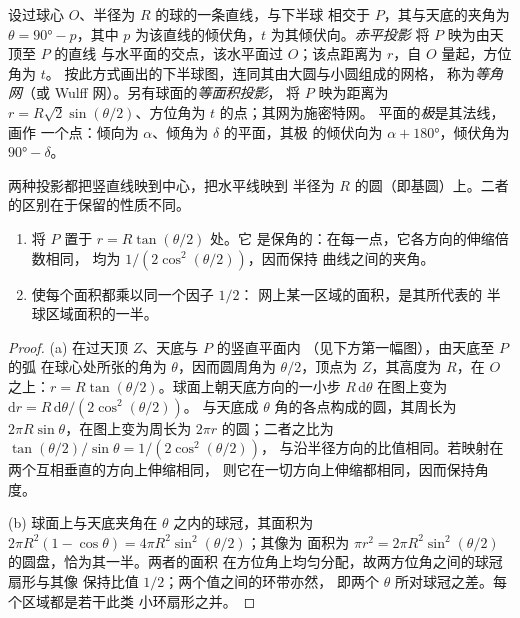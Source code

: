 \begin{definition}\label{def:b3:structural-analysis:stereo}
设过球心 $O$、半径为 $R$ 的球的一条直线，与下半球
相交于 $P$，其与天底的夹角为 $\theta = \ang{90} - p$，其中
$p$ 为该直线的倾伏角，$t$ 为其倾伏向。\emph{赤平投影}
将 $P$ 映为由天顶至 $P$ 的直线
与水平面的交点，该水平面过
$O$；该点距离为 $r$，自 $O$ 量起，方位角为 $t$。
按此方式画出的下半球图，连同其由大圆与小圆组成的网格，
称为\emph{等角网}（或
Wulff 网）。另有球面的\emph{等面积投影}，
将 $P$ 映为距离为 $r =
R\sqrt2\sin(\theta/2)$、方位角为 $t$ 的点；其网为施密特网。
平面的\emph{极}是其法线，画作
一个点：倾向为 $\alpha$、倾角为 $\delta$ 的平面，其极
的倾伏向为 $\alpha + \ang{180}$，倾伏角为 $\ang{90} - \delta$。
\end{definition}

两种投影都把竖直线映到中心，把水平线映到
半径为 $R$ 的圆（即基圆）上。二者的区别在于保留的性质不同。

\begin{theorem}[两种投影]\label{thm:b3:structural-analysis:projections}
\begin{enumerate}[label=(\alph*)]
  \item {}将 $P$ 置于 $r = R\tan(\theta/2)$ 处。它
        是保角的：在每一点，它各方向的伸缩倍数相同，
        均为 $1/(2\cos^2(\theta/2))$，因而保持
        曲线之间的夹角。
  \item {}使每个面积都乘以同一个因子 $1/2$：
        网上某一区域的面积，是其所代表的
        半球区域面积的一半。
\end{enumerate}
\end{theorem}

\begin{proof}
(a) 在过天顶 $Z$、天底与 $P$ 的竖直平面内
（见下方第一幅图），由天底至 $P$ 的弧
在球心处所张的角为 $\theta$，因而圆周角为
$\theta/2$，顶点为 $Z$，其高度为 $R$，在 $O$ 之上：$r =
R\tan(\theta/2)$。球面上朝天底方向的一小步 $R\,\mathrm d\theta$
在图上变为 $\mathrm dr = R\,\mathrm d\theta/(2\cos^2(\theta/2))$。
与天底成 $\theta$ 角的各点构成的圆，其周长为
$2\pi R\sin\theta$，在图上变为周长为 $2\pi
r$ 的圆；二者之比为 $\tan(\theta/2)/\sin\theta = 1/(2\cos^2(\theta/2))$，
与沿半径方向的比值相同。若映射在两个互相垂直的方向上伸缩相同，
则它在一切方向上伸缩都相同，因而保持角度。

(b) 球面上与天底夹角在 $\theta$ 之内的球冠，其面积为
$2\pi R^2(1 - \cos\theta) = 4\pi R^2\sin^2(\theta/2)$；其像为
面积为 $\pi r^2 = 2\pi R^2\sin^2(\theta/2)$ 的圆盘，恰为其一半。两者的面积
在方位角上均匀分配，故两方位角之间的球冠扇形与其像
保持比值 $1/2$；两个值之间的环带亦然，
即两个 $\theta$ 所对球冠之差。每个区域都是若干此类
小环扇形之并。
\end{proof}

